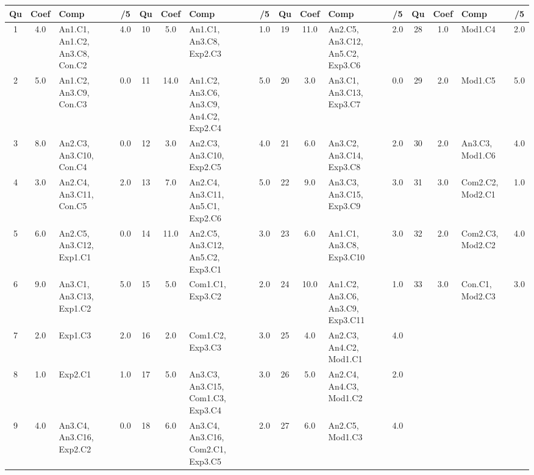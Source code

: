 \begin{center} 
\begin{tabular}{|c|c|m{1cm}|c||c|c|m{1cm}|c||c|c|m{1cm}|c||c|c|m{1cm}|c|} 
\hline \textbf{Qu} & \textbf{Coef} & \textbf{Comp} & \textbf{/5} & \textbf{Qu} & \textbf{Coef} & \textbf{Comp} & \textbf{/5} & \textbf{Qu} & \textbf{Coef} & \textbf{Comp} & \textbf{/5} & \textbf{Qu} & \textbf{Coef} & \textbf{Comp} & \textbf{/5} \\ 
\hline 
\hline 
1 & 4.0 & An1.C1, An1.C2, An3.C8, Con.C2 & 4.0 & 10 & 5.0 & An1.C1, An3.C8, Exp2.C3 & 1.0 & 19 & 11.0 & An2.C5, An3.C12, An5.C2, Exp3.C6 & 2.0 & 28 & 1.0 & Mod1.C4 & 2.0 \\ \hline 
2 & 5.0 & An1.C2, An3.C9, Con.C3 & 0.0 & 11 & 14.0 & An1.C2, An3.C6, An3.C9, An4.C2, Exp2.C4 & 5.0 & 20 & 3.0 & An3.C1, An3.C13, Exp3.C7 & 0.0 & 29 & 2.0 & Mod1.C5 & 5.0 \\ \hline 
3 & 8.0 & An2.C3, An3.C10, Con.C4 & 0.0 & 12 & 3.0 & An2.C3, An3.C10, Exp2.C5 & 4.0 & 21 & 6.0 & An3.C2, An3.C14, Exp3.C8 & 2.0 & 30 & 2.0 & An3.C3, Mod1.C6 & 4.0 \\ \hline 
4 & 3.0 & An2.C4, An3.C11, Con.C5 & 2.0 & 13 & 7.0 & An2.C4, An3.C11, An5.C1, Exp2.C6 & 5.0 & 22 & 9.0 & An3.C3, An3.C15, Exp3.C9 & 3.0 & 31 & 3.0 & Com2.C2, Mod2.C1 & 1.0 \\ \hline 
5 & 6.0 & An2.C5, An3.C12, Exp1.C1 & 0.0 & 14 & 11.0 & An2.C5, An3.C12, An5.C2, Exp3.C1 & 3.0 & 23 & 6.0 & An1.C1, An3.C8, Exp3.C10 & 3.0 & 32 & 2.0 & Com2.C3, Mod2.C2 & 4.0 \\ \hline 
6 & 9.0 & An3.C1, An3.C13, Exp1.C2 & 5.0 & 15 & 5.0 & Com1.C1, Exp3.C2 & 2.0 & 24 & 10.0 & An1.C2, An3.C6, An3.C9, Exp3.C11 & 1.0 & 33 & 3.0 & Con.C1, Mod2.C3 & 3.0 \\ \hline 
7 & 2.0 & Exp1.C3 & 2.0 & 16 & 2.0 & Com1.C2, Exp3.C3 & 3.0 & 25 & 4.0 & An2.C3, An4.C2, Mod1.C1 & 4.0 &  &  &  &  \\ \hline 

8 & 1.0 & Exp2.C1 & 1.0 & 17 & 5.0 & An3.C3, An3.C15, Com1.C3, Exp3.C4 & 3.0 & 26 & 5.0 & An2.C4, An4.C3, Mod1.C2 & 2.0 &  &  &  &  \\ \hline 

9 & 4.0 & An3.C4, An3.C16, Exp2.C2 & 0.0 & 18 & 6.0 & An3.C4, An3.C16, Com2.C1, Exp3.C5 & 2.0 & 27 & 6.0 & An2.C5, Mod1.C3 & 4.0 &  &  &  &  \\ \hline 

\end{tabular} 
\end{center} 
\normalsize 
 
